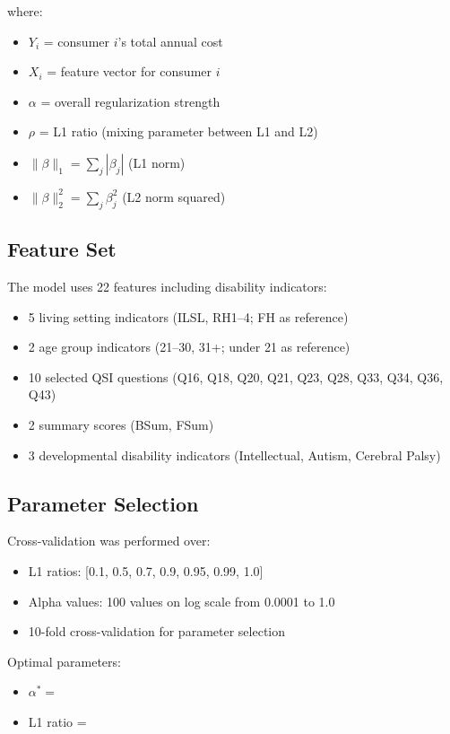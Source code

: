 where:
\begin{itemize}
    \item $Y_i$ = consumer $i$'s total annual cost
    \item $X_i$ = feature vector for consumer $i$
    \item $\alpha$ = overall regularization strength
    \item $\rho$ = L1 ratio (mixing parameter between L1 and L2)
    \item $\|\beta\|_1 = \sum_{j}|\beta_j|$ (L1 norm)
    \item $\|\beta\|_2^2 = \sum_{j}\beta_j^2$ (L2 norm squared)
\end{itemize}

\subsection{Feature Set}

The model uses 22 features including disability indicators:
\begin{itemize}
    \item 5 living setting indicators (ILSL, RH1--4; FH as reference)
    \item 2 age group indicators (21--30, 31+; under 21 as reference)
    \item 10 selected QSI questions (Q16, Q18, Q20, Q21, Q23, Q28, Q33, Q34, Q36, Q43)
    \item 2 summary scores (BSum, FSum)
    \item 3 developmental disability indicators (Intellectual, Autism, Cerebral Palsy)
\end{itemize}

\subsection{Parameter Selection}

Cross-validation was performed over:
\begin{itemize}
    \item L1 ratios: [0.1, 0.5, 0.7, 0.9, 0.95, 0.99, 1.0]
    \item Alpha values: 100 values on log scale from 0.0001 to 1.0
    \item 10-fold cross-validation for parameter selection
\end{itemize}

Optimal parameters:
\begin{itemize}
    \item $\alpha^* = $ \ModelSixAlpha{}
    \item L1 ratio = \ModelSixLOneRatio{}
\end{itemize}

